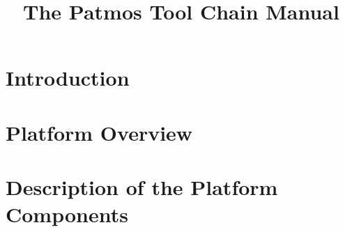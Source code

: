 \documentclass[11pt,twoside,a4paper]{report}
\title{The Patmos Tool Chain Manual}
\begin{document}
\maketitle

\newpage
\tableofcontents

\newpage

\cleardoublepage





\chapter{Introduction}


\chapter{Platform Overview}


\chapter{Description of the Platform Components}





\end{document}

